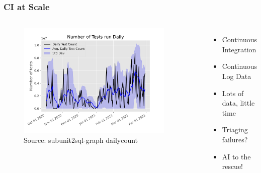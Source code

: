 \documentclass[aspectratio=169,11pt,hyperref={colorlinks=true}]{beamer}
\begin{document}
\begin{frame}
  \frametitle{CI at Scale}
  \begin{columns}
      \begin{figure}
      \begin{center}
        \includegraphics[width=0.9\textwidth]{graphs/daily_count.png}
           \caption{Source: subunit2sql-graph dailycount}
      \end{center}
      \end{figure}
      \begin{itemize}
          \item{Continuous Integration}
          \item{Continuous Log Data}
          \item{Lots of data, little time}
          \item{Triaging failures?}
          \item{AI to the rescue!}
      \end{itemize}
  \end{columns}
\end{frame}
\end{document}
